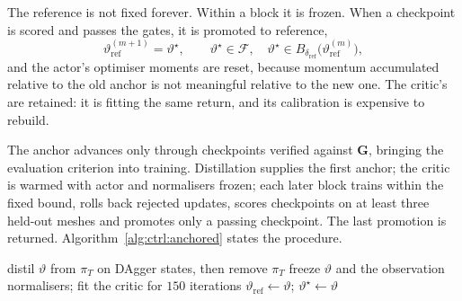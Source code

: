 The reference is not fixed forever. Within a block it is frozen. When a
checkpoint is scored and passes the gates, it is promoted to reference,
%
\begin{equation}
  \label{eq:ctrl:ratchet}
  \vartheta_{\mathrm{ref}}^{(m+1)} = \vartheta^{\star},
  \qquad
  \vartheta^{\star} \in \mathcal{F},
  \quad
  \vartheta^{\star} \in
  B_{\delta_{\mathrm{ref}}}\bigl(\vartheta_{\mathrm{ref}}^{(m)}\bigr),
\end{equation}
%
and the actor's optimiser moments are reset, because momentum accumulated
relative to the old anchor is not meaningful relative to the new one. The
critic's are retained: it is fitting the same return, and its calibration is
expensive to rebuild.

The anchor advances only through checkpoints verified against $\bm{G}$, bringing
the evaluation criterion into training. Distillation supplies the first anchor;
the critic is warmed with actor and normalisers frozen; each later block trains
within the fixed bound, rolls back rejected updates, scores checkpoints on at
least three held-out meshes and promotes only a passing checkpoint. The last
promotion is returned. Algorithm~\ref{alg:ctrl:anchored} states the procedure.

\begin{algorithm}[!ht]
  \footnotesize
  \DontPrintSemicolon
  \BlankLine
  distil $\vartheta$ from $\pi_T$ on DAgger states, then remove $\pi_T$
  freeze $\vartheta$ and the observation normalisers; fit the critic for $150$
    iterations\;
  $\vartheta_{\mathrm{ref}}\leftarrow\vartheta$;\quad
    $\vartheta^{\star}\leftarrow\vartheta$\;
  \Return{$\vartheta^{\star}$}\;
  \caption{Reference-anchored PPO. The teacher is used only for distillation,
  every rollout is controlled by $\pi_\vartheta$ alone, and the frozen
  reference moves only when a checkpoint passes every gate.}
  \label{alg:ctrl:anchored}
\end{algorithm}

